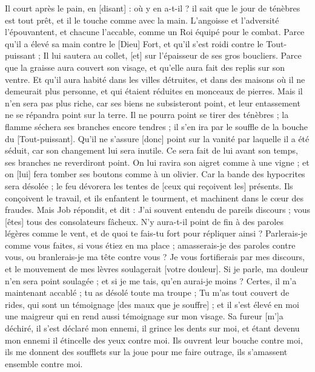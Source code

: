 \begin{multicols}{2}
Il court après le pain, en [disant] : où y en a-t-il ? il sait que le jour de ténèbres est tout prêt, et il le touche comme avec la main.
L'angoisse et l'adversité l'épouvantent, et chacune l'accable, comme un Roi équipé pour le combat.
Parce qu'il a élevé sa main contre le [Dieu] Fort, et qu'il s'est roidi contre le Tout-puissant ;
Il lui sautera au collet, [et] sur l'épaisseur de ses gros boucliers.
Parce que la graisse aura couvert son visage, et qu'elle aura fait des replis sur son ventre.
Et qu'il aura habité dans les villes détruites, et dans des maisons où il ne demeurait plus personne, et qui étaient réduites en monceaux de pierres.
Mais il n'en sera pas plus riche, car ses biens ne subsisteront point, et leur entassement ne se répandra point sur la terre.
Il ne pourra point se tirer des ténèbres ; la flamme séchera ses branches encore tendres ; il s'en ira par le souffle de la bouche du [Tout-puissant].
Qu'il ne s'assure [donc] point sur la vanité par laquelle il a été séduit, car son changement lui sera inutile.
Ce sera fait de lui avant son temps, ses branches ne reverdiront point.
On lui ravira son aigret comme à une vigne ; et on [lui] fera tomber ses boutons comme à un olivier.
Car la bande des hypocrites sera désolée ; le feu dévorera les tentes de [ceux qui reçoivent les] présents.
Ils conçoivent le travail, et ils enfantent le tourment, et machinent dans le cœur des fraudes.
\VerseOne{}Mais Job répondit, et dit :
J'ai souvent entendu de pareils discours ; vous [êtes] tous des consolateurs fâcheux.
N'y aura-t-il point de fin à des paroles légères comme le vent, et de quoi te fais-tu fort pour répliquer ainsi ?
Parlerais-je comme vous faites, si vous étiez en ma place ; amasserais-je des paroles contre vous, ou branlerais-je ma tête contre vous ?
Je vous fortifierais par mes discours, et le mouvement de mes lèvres soulagerait [votre douleur].
Si je parle, ma douleur n'en sera point soulagée ; et si je me tais, qu'en aurai-je moins ?
Certes, il m'a maintenant accablé ; tu as désolé toute ma troupe ;
Tu m'as tout couvert de rides, qui sont un témoignage [des maux que je souffre] ; et il s'est élevé en moi une maigreur qui en rend aussi témoignage sur mon visage.
Sa fureur [m']a déchiré, il s'est déclaré mon ennemi, il grince les dents sur moi, et étant devenu mon ennemi il étincelle des yeux contre moi.
Ils ouvrent leur bouche contre moi, ils me donnent des soufflets sur la joue pour me faire outrage, ils s'amassent ensemble contre moi.

\end{multicols}
